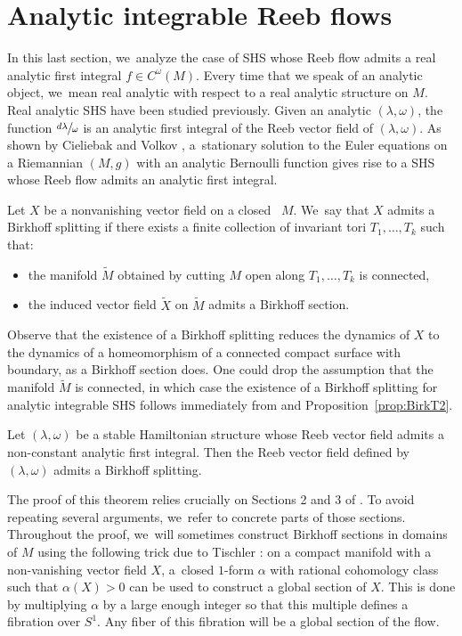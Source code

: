 \section{Analytic integrable Reeb flows}\label{sec:analytic}

In this last section, we~analyze the case of SHS whose Reeb flow admits a real analytic first integral $f\in C^\omega (M)$. Every time that we speak of an analytic object, we~mean real analytic with respect to a real analytic structure on $M$. Real analytic SHS have been studied previously. Given an analytic $(\lambda,\omega)$, the function $\sfrac{d\lambda}{\omega}$ is an analytic first integral of the Reeb vector field of $(\lambda,\omega)$. As shown by
Cieliebak and Volkov \cite{CV2}, a~stationary solution to the Euler equations on a Riemannian \threemanifold $(M,g)$ with an analytic Bernoulli function gives rise to a SHS whose Reeb flow admits an analytic first integral.

\begin{defi}\label{def:Bsplit}
Let $X$ be a nonvanishing vector field on a closed \threemanifold~$M$. We~say that $X$ admits a Birkhoff splitting if there exists a finite collection of invariant tori $T_1,\dots,T_k$ such that:
\begin{itemize}
\item
the manifold $\widetilde M$ obtained by cutting $M$ open along $T_1,\dots,T_k$ is connected,
\item
the induced vector field $\widetilde X$ on $\widetilde M$ admits a Birkhoff section.
\end{itemize}
\end{defi}
Observe that the existence of a Birkhoff splitting reduces the dynamics of $X$ to the dynamics of a homeomorphism of a connected compact surface with boundary, as a Birkhoff section does. One could drop the assumption that the manifold $\widetilde M$ is connected, in which case the existence of a Birkhoff splitting for analytic integrable SHS follows immediately from \cite{CV2} and Proposition~\ref{prop:BirkT2}.

\begin{theorem}\label{thm:split}
Let $(\lambda,\omega)$ be a stable Hamiltonian structure whose Reeb vector field admits a non-constant analytic first integral. Then the Reeb vector field defined by $(\lambda,\omega)$ admits a Birkhoff splitting.
\end{theorem}

The proof of this theorem relies crucially on Sections 2 and 3 of \cite{CV2}. To avoid repeating several arguments, we~refer to concrete parts of those sections. Throughout the proof, we~will sometimes construct Birkhoff sections in domains of $M$ using the following trick due to Tischler \cite{Tis}: on a compact manifold with a non-vanishing vector field $X$, a~closed $1$-form $\alpha$ with rational cohomology class such that $\alpha(X)>0$ can be used to construct a global section of $X$. This is done by multiplying $\alpha$ by a large enough integer so that this multiple defines a fibration over $S^1$. Any fiber of this fibration will be a global section of the flow.

